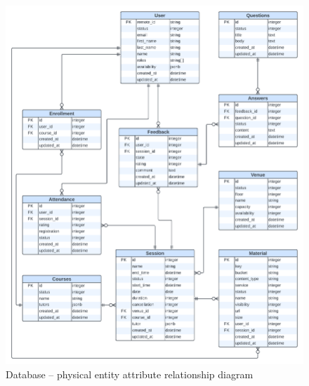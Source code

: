 \begin{justify}
    \begin{figure}[H]
    \centerline{\includegraphics[width=150mm,scale=1]{figures/analysis_and_design/design/3. Physical Enitiy Attribute Relationship Diagram V2.png}}
    \caption{Database -- physical entity attribute relationship diagram}
    \label{physicalEARD}
    \end{figure}

\end{justify}


\clearpage